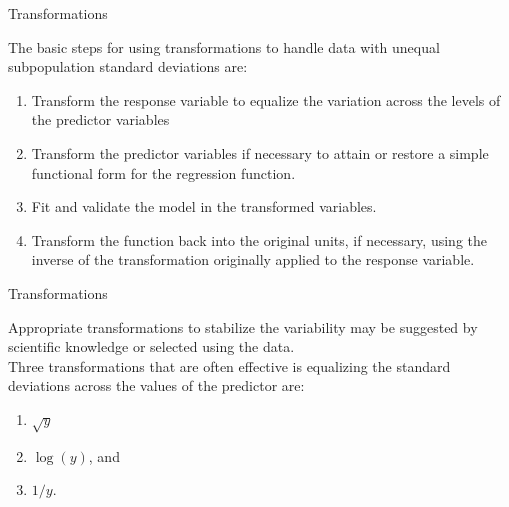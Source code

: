 {{%
\begin{figure}
\end{figure}
\newpage
\begin{center}
Transformations
\end{center}
\vspace{0.6in}
The basic steps for using transformations to handle data with
unequal subpopulation standard deviations are:
\vspace{0.4in}
\begin{enumerate}
\item Transform the response variable to equalize the variation
across the levels of the predictor variables
\vspace{0.15in}
\item Transform the predictor variables if necessary to attain
or restore a simple functional form for the regression function.
\vspace{0.15in}
\item Fit and validate the model in the transformed variables.
\vspace{0.15in}
\item Transform the function back into the original units, if 
necessary, using the inverse of the transformation originally 
applied to the response variable.
\end{enumerate}
\newpage
\begin{center}
Transformations
\end{center}
\vspace{0.75in}
Appropriate transformations to stabilize the 
variability may be suggested by scientific knowledge
or selected using the data. \\
\vspace{0.5in}
Three transformations that are often effective is
equalizing the standard deviations across the
values of the predictor are:
\vspace{0.5in}
\begin{enumerate}
\item $\sqrt{y}$
\item $\log(y)$, and
\item $1/y$.
\end{enumerate}
\begin{figure}
\end{figure}
\begin{figure}
\end{figure}
}}

